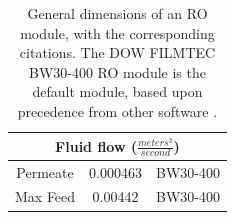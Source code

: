 \begin{savenotes}
\begin{table}[!h]
\begin{tabular}{|c|c|c|}
        \multicolumn{3}{c}{Fluid flow ($\frac{meters^3}{second}$)} \\ \midrule
        Permeate & 0.000463 & BW30-400 \cite{2020FilmTecElement}\\
        Max Feed & 0.00442 & BW30-400 \cite{2020FilmTecElement}\\ \bottomrule
        
    \end{tabular}
    
    \caption{
        General dimensions of an RO module, with the corresponding citations. The DOW FILMTEC BW30-400 RO module is the default module, based upon precedence from other software \cite{Li2012OptimalDesalination}.
    }
    \label{RO_dimensions}
\end{table}
\end{savenotes}

